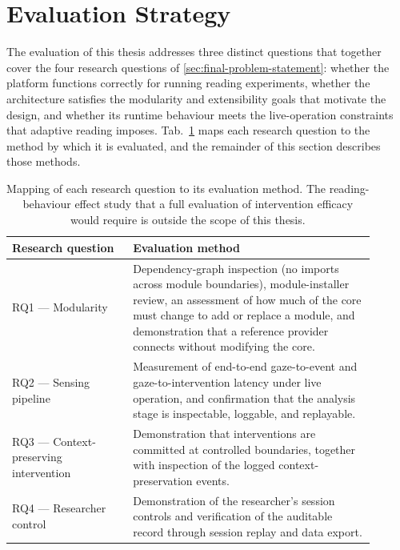 \section{Evaluation Strategy}
\label{sec:evaluation-strategy}

The evaluation of this thesis addresses three distinct questions that together cover the four research questions of \cref{sec:final-problem-statement}: whether the platform functions correctly for running reading experiments, whether the architecture satisfies the modularity and extensibility goals that motivate the design, and whether its runtime behaviour meets the live-operation constraints that adaptive reading imposes.
Tab.~\ref{tab:rq-evaluation} maps each research question to the method by which it is evaluated, and the remainder of this section describes those methods.

\begin{table}[htbp]
\centering
\caption[Mapping of each research question to its evaluation method.]{Mapping of each research question to its evaluation method. The reading-behaviour effect study that a full evaluation of intervention efficacy would require is outside the scope of this thesis.}
\label{tab:rq-evaluation}
\begin{tabular}{p{0.30\linewidth} p{0.60\linewidth}}
\toprule
Research question & Evaluation method \\
\midrule
RQ1 --- Modularity & Dependency-graph inspection (no imports across module boundaries), module-installer review, an assessment of how much of the core must change to add or replace a module, and demonstration that a reference provider connects without modifying the core. \\
RQ2 --- Sensing pipeline & Measurement of end-to-end gaze-to-event and gaze-to-intervention latency under live operation, and confirmation that the analysis stage is inspectable, loggable, and replayable. \\
RQ3 --- Context-preserving intervention & Demonstration that interventions are committed at controlled boundaries, together with inspection of the logged context-preservation events. \\
RQ4 --- Researcher control & Demonstration of the researcher's session controls and verification of the auditable record through session replay and data export. \\
\bottomrule
\end{tabular}
\end{table}

